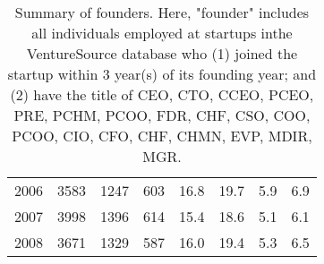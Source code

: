 \begin{table}[!htb]
\begin{tabular}{p{1.75cm}p{1.75cm}p{1.75cm}p{1.75cm}p{1.75cm}p{1.75cm}p{1.75cm}p{1.75cm}}
  2006 & 3583 & 1247 & 603 & 16.8 & 19.7 & 5.9 & 6.9 \\ 
  2007 & 3998 & 1396 & 614 & 15.4 & 18.6 & 5.1 & 6.1 \\ 
  2008 & 3671 & 1329 & 587 & 16.0 & 19.4 & 5.3 & 6.5 \\ 
   \bottomrule
\end{tabular}
\endgroup
\caption{Summary of founders. Here, "founder" includes all individuals employed at startups inthe VentureSource database who (1) joined the startup within 3 year(s) of its founding year; and (2) have the title of CEO, CTO, CCEO, PCEO, PRE, PCHM, PCOO, FDR, CHF, CSO, COO, PCOO, CIO, CFO, CHF, CHMN, EVP, MDIR, MGR.} 
\label{table:GStable_executive}
\end{table}
